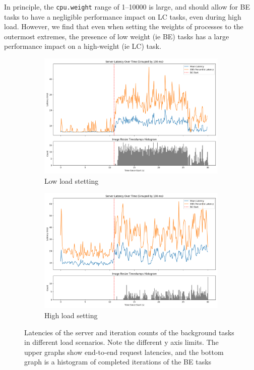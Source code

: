 In principle, the \texttt{cpu.weight} range of 1--10000 is large, and should
allow for BE tasks to have a negligible performance impact on LC tasks, even
during high load. However, we find that even when setting the weights of
processes to the outermost extremes, the presence of low weight (ie BE) tasks
has a large performance impact on a high-weight (ie LC) task.


\begin{figure}[t]
    \centering
    \begin{subfigure}[b]{0.49\columnwidth}
        \includegraphics[width=\columnwidth]{graphs/unedited-weight-low-two.png}
        \caption{Low load stetting}\label{fig:unedited-weight-low-two}
    \end{subfigure}
    \hspace{\fill}
    \begin{subfigure}[b]{0.49\columnwidth}
        \includegraphics[width=\columnwidth]{graphs/unedited-weight-high-two.png}
        \caption{High load setting}\label{fig:unedited-weight-high-two}
    \end{subfigure}
    \vspace{4pt}
    \caption{Latencies of the server and iteration counts of the background
    tasks in different load scenarios. Note the different y axis limits. The
    upper graphs show end-to-end request latencies, and the bottom graph is a
    histogram of completed iterations of the BE tasks}\label{fig:unedited-weight}
\end{figure}

